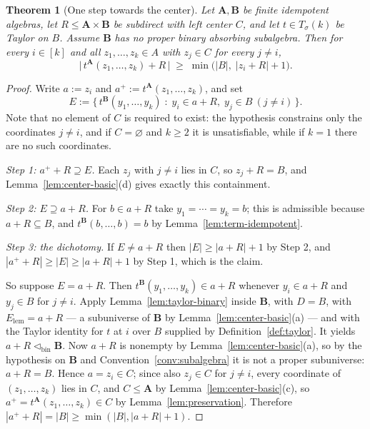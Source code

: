 \documentclass[11pt]{article}
\theoremstyle{mainplain}
\newtheorem{theorem}{Theorem}[section]
\theoremstyle{mainroman}
\theoremstyle{definition}
\numberwithin{equation}{section}
\newcommand{\bA}{\mathbf A}
\newcommand{\bB}{\mathbf B}
\newcommand{\abin}{\lhd_{\mathrm{bin}}}
\newcommand{\Tm}{T_\sigma}
\begin{document}
\begin{theorem}[One step towards the center]\label{thm:center-step}
Let $\bA,\bB$ be finite idempotent algebras, let $R\le\bA\times\bB$ be
subdirect with left center $C$, and let $t\in\Tm(k)$ be Taylor on $B$. Assume
$\bB$ has no proper binary absorbing subalgebra. Then for every $i\in[k]$ and
all $z_1,\dots,z_k\in A$ with $z_j\in C$ for every $j\ne i$,
\[
 \bigl|\,t^{\bA}(z_1,\dots,z_k)+R\,\bigr|
 \;\ge\;\min\bigl(|B|,\;|z_i+R|+1\bigr).
\]
\end{theorem}
\begin{proof}
Write $a:=z_i$ and $a^{+}:=t^{\bA}(z_1,\dots,z_k)$, and set
\[
 E:=\bigl\{\,t^{\bB}(y_1,\dots,y_k)\;:\;y_i\in a+R,\;y_j\in B\ (j\ne i)\,\bigr\}.
\]
Note that no element of $C$ is required to exist: the hypothesis constrains only
the coordinates $j\ne i$, and if $C=\varnothing$ and $k\ge2$ it is unsatisfiable,
while if $k=1$ there are no such coordinates.

\emph{Step 1: $a^{+}+R\supseteq E$.} Each $z_j$ with $j\ne i$ lies in $C$, so
$z_j+R=B$, and Lemma~\ref{lem:center-basic}(d) gives exactly this containment.

\emph{Step 2: $E\supseteq a+R$.} For $b\in a+R$ take $y_1=\cdots=y_k=b$; this is
admissible because $a+R\subseteq B$, and $t^{\bB}(b,\dots,b)=b$ by
Lemma~\ref{lem:term-idempotent}.

\emph{Step 3: the dichotomy.} If $E\ne a+R$ then $|E|\ge|a+R|+1$ by Step 2, and
$|a^{+}+R|\ge|E|\ge|a+R|+1$ by Step 1, which is the claim.

So suppose $E=a+R$. Then $t^{\bB}(y_1,\dots,y_k)\in a+R$ whenever
$y_i\in a+R$ and $y_j\in B$ for $j\ne i$. Apply Lemma~\ref{lem:taylor-binary}
inside $\bB$, with $D=B$, with $E_{\text{lem}}=a+R$ --- a subuniverse of $\bB$
by Lemma~\ref{lem:center-basic}(a) --- and with the Taylor identity for $t$ at
$i$ over $B$ supplied by Definition~\ref{def:taylor}. It yields
$a+R\abin\bB$. Now $a+R$ is nonempty by Lemma~\ref{lem:center-basic}(a), so by
the hypothesis on $\bB$ and Convention~\ref{conv:subalgebra} it is not a proper
subuniverse: $a+R=B$. Hence $a=z_i\in C$; since also $z_j\in C$ for $j\ne i$,
every coordinate of $(z_1,\dots,z_k)$ lies in $C$, and $C\le\bA$ by
Lemma~\ref{lem:center-basic}(c), so $a^{+}=t^{\bA}(z_1,\dots,z_k)\in C$ by
Lemma~\ref{lem:preservation}. Therefore
$|a^{+}+R|=|B|\ge\min(|B|,|a+R|+1)$.
\end{proof}
\end{document}
